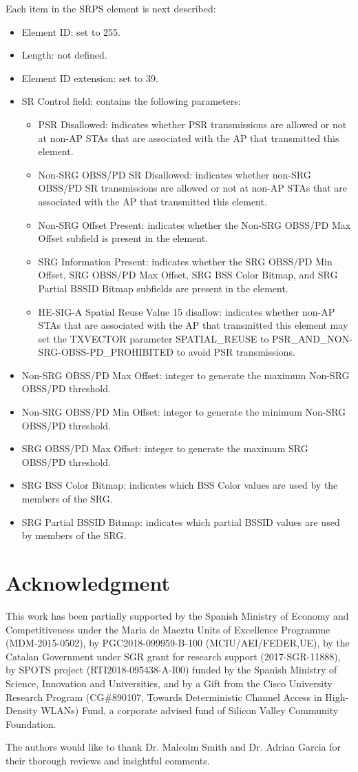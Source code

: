 \documentclass{article}
\begin{document}
\begin{appendices}
Each item in the SRPS element is next described:
\begin{itemize}
	\item Element ID: set to 255.
	\item Length: not defined.
	\item Element ID extension: set to 39.
	\item SR Control field: contains the following parameters:
	\begin{itemize}
		\item PSR Disallowed: indicates whether PSR transmissions are allowed or not at non-AP STAs that are associated with the AP that transmitted this element.
		\item Non-SRG OBSS/PD SR Disallowed: indicates whether non-SRG OBSS/PD SR transmissions are allowed or not at non-AP STAs that are associated with the AP that transmitted this element.
		\item Non-SRG Offset Present: indicates whether the Non-SRG OBSS/PD Max Offset subfield is present in the element.
		\item SRG Information Present: indicates whether the SRG OBSS/PD Min Offset, SRG OBSS/PD Max Offset, SRG BSS Color Bitmap, and SRG Partial BSSID Bitmap subfields are present in the element.
		\item HE-SIG-A Spatial Reuse Value 15 disallow: indicates whether non-AP STAs that are associated with the AP that transmitted this element may set the TXVECTOR parameter SPATIAL\_REUSE to PSR\_AND\_NON-SRG-OBSS-PD\_PROHIBITED to avoid PSR transmissions.
	\end{itemize}
	\item Non-SRG OBSS/PD Max Offset: integer to generate the maximum Non-SRG OBSS/PD threshold.
	\item Non-SRG OBSS/PD Min Offset: integer to generate the minimum Non-SRG OBSS/PD threshold.
	\item SRG OBSS/PD Max Offset: integer to generate the maximum SRG OBSS/PD threshold.
	\item SRG BSS Color Bitmap: indicates which BSS Color values are used by the members of the SRG.
	\item SRG Partial BSSID Bitmap: indicates which partial BSSID values are used by members of the SRG.
\end{itemize}

\end{appendices}

\section*{Acknowledgment}
This  work  has  been  partially  supported  by  the  Spanish Ministry of Economy and Competitiveness under the Maria de Maeztu  Units  of  Excellence  Programme  (MDM-2015-0502), by PGC2018-099959-B-100 (MCIU/AEI/FEDER,UE), by the Catalan Government under SGR grant for research support (2017-SGR-11888), by SPOTS project (RTI2018-095438-A-I00) funded by the Spanish Ministry of Science, Innovation and Universities, and  by a Gift from the Cisco University Research Program (CG\#890107, Towards Deterministic Channel Access in High-Density WLANs) Fund, a corporate advised fund of Silicon Valley Community Foundation.

The authors would like to thank Dr. Malcolm Smith and Dr. Adrian Garcia for their thorough reviews and insightful comments.



\end{document}
